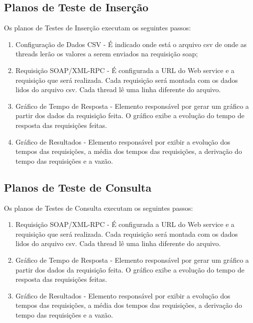 \subsection{Planos de Teste de Inserção}

Os planos de Testes de Inserção executam os seguintes passos:

\begin{enumerate}
\item Configuração de Dados CSV - É indicado onde está o arquivo csv de onde as threads lerão os valores a serem enviados na requisição soap;
\item Requisição SOAP/XML-RPC - É configurada a URL do Web service e a requisição que será realizada. Cada requisição será montada com os dados lidos do arquivo csv. Cada thread lê uma linha diferente do arquivo.
\item Gráfico de Tempo de Resposta -  Elemento responsável por gerar um gráfico a partir dos dados da requisição feita. O gráfico exibe a  evolução do tempo de resposta das requisições feitas.
\item Gráfico de Resultados - Elemento responsável por exibir a evolução dos tempos das requisições, a média dos tempos das requisições, a derivação do tempo das requisições e a vazão.
\end{enumerate}

\subsection{Planos de Teste de Consulta}

Os planos de Testes de Consulta executam os seguintes passos:

\begin{enumerate}
\item Requisição SOAP/XML-RPC - É configurada a URL do Web service e a requisição que será realizada. Cada requisição será montada com os dados lidos do arquivo csv. Cada thread lê uma linha diferente do arquivo.
\item Gráfico de Tempo de Resposta -  Elemento responsável por gerar um gráfico a partir dos dados da requisição feita. O gráfico exibe a  evolução do tempo de resposta das requisições feitas.
\item Gráfico de Resultados - Elemento responsável por exibir a evolução dos tempos das requisições, a média dos tempos das requisições, a derivação do tempo das requisições e a vazão.
\end{enumerate}



